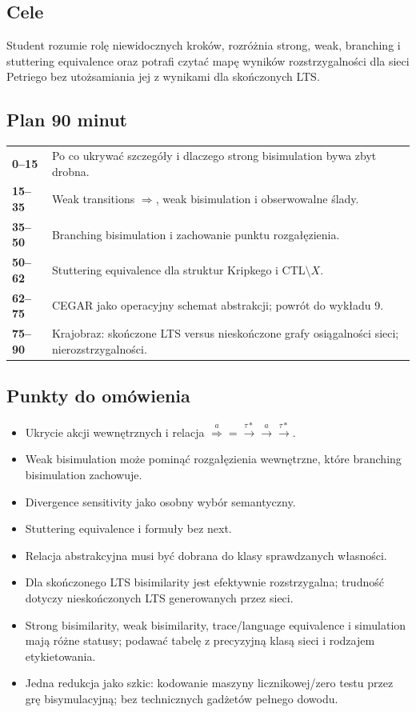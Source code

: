 \documentclass[11pt,a4paper]{article}
\begin{document}
\subsection{Cele}
Student rozumie rolę niewidocznych kroków, rozróżnia strong, weak, branching i stuttering equivalence oraz potrafi czytać mapę wyników rozstrzygalności dla sieci Petriego bez utożsamiania jej z wynikami dla skończonych LTS.

\subsection{Plan 90 minut}
\begin{center}\small\begin{tabularx}{0.96\textwidth}{@{}>{\bfseries}p{18mm}X@{}}
0--15 & Po co ukrywać szczegóły i dlaczego strong bisimulation bywa zbyt drobna.\\
15--35 & Weak transitions $\Rightarrow$, weak bisimulation i obserwowalne ślady.\\
35--50 & Branching bisimulation i zachowanie punktu rozgałęzienia.\\
50--62 & Stuttering equivalence dla struktur Kripkego i CTL$\setminus X$.\\
62--75 & CEGAR jako operacyjny schemat abstrakcji; powrót do wykładu 9.\\
75--90 & Krajobraz: skończone LTS versus nieskończone grafy osiągalności sieci; nierozstrzygalności.\\
\end{tabularx}\end{center}

\subsection{Punkty do omówienia}
\begin{itemize}
\item Ukrycie akcji wewnętrznych i relacja $\overset{a}{\Rightarrow}=\xrightarrow{\tau *}\xrightarrow{a}\xrightarrow{\tau *}$.
\item Weak bisimulation może pominąć rozgałęzienia wewnętrzne, które branching bisimulation zachowuje.
\item Divergence sensitivity jako osobny wybór semantyczny.
\item Stuttering equivalence i formuły bez next.
\item Relacja abstrakcyjna musi być dobrana do klasy sprawdzanych własności.
\item Dla skończonego LTS bisimilarity jest efektywnie rozstrzygalna; trudność dotyczy nieskończonych LTS generowanych przez sieci.
\item Strong bisimilarity, weak bisimilarity, trace/language equivalence i simulation mają różne statusy; podawać tabelę z precyzyjną klasą sieci i rodzajem etykietowania.
\item Jedna redukcja jako szkic: kodowanie maszyny licznikowej/zero testu przez grę bisymulacyjną; bez technicznych gadżetów pełnego dowodu.
\end{itemize}
\end{document}
